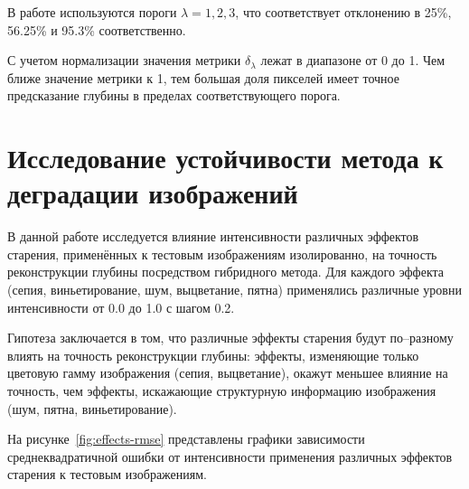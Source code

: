 В работе используются пороги $\lambda=1,2,3$, что соответствует отклонению в 25\%, 56.25\% и 95.3\% соответственно.

С учетом нормализации значения метрики $\delta_{\lambda}$ лежат в диапазоне от 0 до 1.
Чем ближе значение метрики к 1, тем большая доля пикселей имеет точное предсказание глубины в пределах соответствующего порога.

\section{Исследование устойчивости метода к деградации изображений}

В данной работе исследуется влияние интенсивности различных эффектов старения,
применённых к тестовым изображениям изолированно,
на точность реконструкции глубины посредством гибридного метода.
Для каждого эффекта (сепия, виньетирование, шум, выцветание, пятна) применялись различные уровни интенсивности от 0.0 до 1.0 с шагом 0.2.

Гипотеза заключается в том, что различные эффекты старения будут по--разному влиять на точность реконструкции глубины:
эффекты, изменяющие только цветовую гамму изображения (сепия, выцветание), окажут меньшее влияние на точность,
чем эффекты, искажающие структурную информацию изображения (шум, пятна, виньетирование).

На рисунке~\ref{fig:effects-rmse} представлены графики зависимости среднеквадратичной ошибки от интенсивности применения различных эффектов старения к тестовым изображениям.

